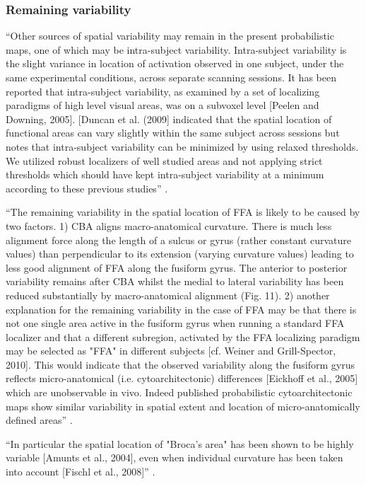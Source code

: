 \subsubsection{Remaining variability}


``Other sources of spatial variability may remain in the present probabilistic
maps, one of which may be intra-subject variability.
%
Intra-subject variability is the slight variance in location of activation
observed in one subject, under the same experimental conditions, across separate
scanning sessions.
%
It has been reported that intra-subject variability, as examined by a set of
localizing paradigms of high level visual areas, was on a subvoxel level [Peelen
and Downing, 2005].
%
[Duncan et al. (2009] indicated that the spatial location of functional areas
can vary slightly within the same subject across sessions but notes that
intra-subject variability can be minimized by using relaxed thresholds.
%
We utilized robust localizers of well studied areas and not applying strict
thresholds which should have kept intra-subject variability at a minimum
according to these previous studies'' \citep{frost2012measuring}.


``The remaining variability in the spatial location of FFA is likely to be
caused by two factors.
%
1) CBA aligns macro-anatomical curvature.
%
There is much less alignment force along the length of a sulcus or gyrus (rather
constant curvature values) than perpendicular to its extension (varying
curvature values) leading to less good alignment of FFA along the fusiform
gyrus.
%
The anterior to posterior variability remains after CBA whilst the medial to
lateral variability has been reduced substantially by macro-anatomical alignment
(Fig. 11).
%
2) another explanation for the remaining variability in the case of FFA may be
that there is not one single area active in the fusiform gyrus when running a
standard FFA localizer and that a different subregion, activated by the FFA
localizing paradigm may be selected as "FFA" in different subjects [cf. Weiner
and Grill-Spector, 2010].
%
This would indicate that the observed variability along the fusiform gyrus
reflects micro-anatomical (i.e.  cytoarchitectonic) differences [Eickhoff et
al., 2005] which are unobservable in vivo.
%
Indeed published probabilistic cytoarchitectonic maps show similar variability
in spatial extent and location of micro-anatomically defined areas''
\citep{frost2012measuring}.

``In particular the spatial location of "Broca's area" has been shown to be
highly variable [Amunts et al., 2004], even when individual curvature has been
taken into account [Fischl et al., 2008]'' \citep{frost2012measuring}.

